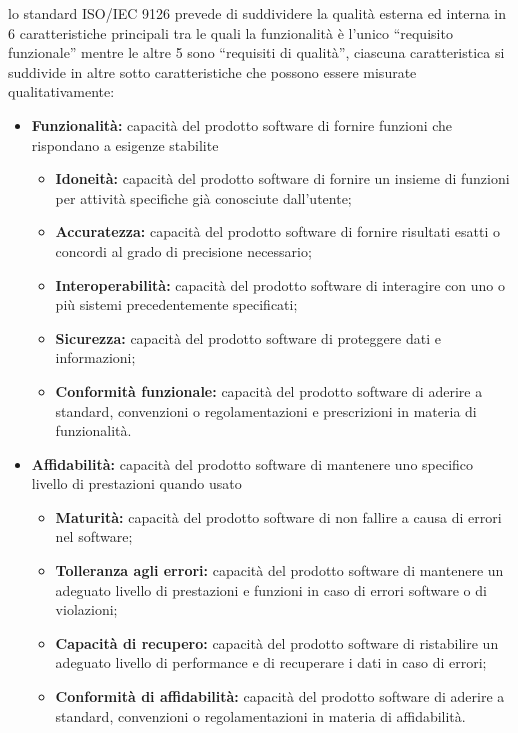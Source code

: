 \documentclass[a4paper]{article}
\begin{document}
				lo standard ISO/IEC 9126 prevede di suddividere la qualità esterna ed interna in 6 caratteristiche principali tra
				le quali la funzionalità è l'unico “requisito funzionale”  mentre le altre 5 sono “requisiti di qualità”, ciascuna
				caratteristica si suddivide in altre sotto caratteristiche che possono essere misurate qualitativamente:
				\begin{itemize}
					\item \textbf{Funzionalità:} capacità del prodotto software di fornire funzioni che rispondano
					a esigenze stabilite
					\begin{itemize}
						\item \textbf{Idoneità:} capacità del prodotto software di fornire un insieme di funzioni per attività
						specifiche già conosciute dall'utente;
						\item \textbf{Accuratezza:} capacità del prodotto software di fornire risultati esatti o concordi al grado di precisione necessario;
						\item \textbf{Interoperabilità:} capacità del prodotto software di interagire con uno o più sistemi 
						precedentemente specificati;
						\item \textbf{Sicurezza:} capacità del prodotto software di proteggere dati e informazioni;
						\item \textbf{Conformità funzionale:} capacità del prodotto software di aderire a standard, convenzioni
						o regolamentazioni e prescrizioni in materia di funzionalità.
					\end{itemize}
					
					\item \textbf{Affidabilità:} capacità del prodotto software di mantenere uno specifico livello di prestazioni
					quando usato
					\begin{itemize}
						\item \textbf{Maturità:} capacità del prodotto software di non fallire a causa di errori nel software;
						\item \textbf{Tolleranza agli errori:} capacità del prodotto software di mantenere un adeguato livello di
						prestazioni e funzioni in caso di errori software o di violazioni;
						\item \textbf{Capacità di recupero:} capacità del prodotto software di ristabilire un adeguato livello di
						performance e di recuperare i dati in caso di errori;
						\item \textbf{Conformità di affidabilità:} capacità del prodotto software di aderire a standard,
						convenzioni o regolamentazioni in materia di affidabilità.
					\end{itemize}										
					

\end{itemize}
\end{document}
